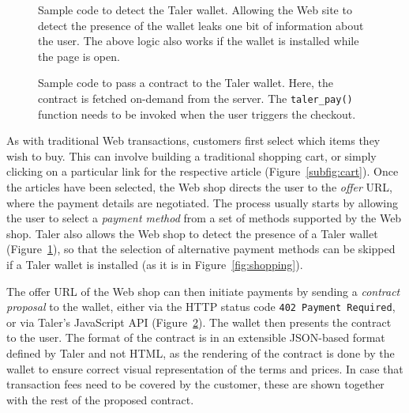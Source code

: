 \documentclass{llncs}
\begin{document}
{}

\begin{figure}[h!]
 \lstset{language=HTML5}
 
 \caption{Sample code to detect the Taler wallet. Allowing the
  Web site to detect the presence of the wallet leaks one bit
  of information about the user. The above logic also works
  if the wallet is installed while the page is open.}
  \label{listing:presence}
\end{figure}


\begin{figure}[h!]
 \lstset{language=JavaScript}
 
 \caption{Sample code to pass a contract to the Taler wallet.
          Here, the contract is fetched on-demand from the server.
          The {\tt taler\_pay()} function needs to be invoked
          when the user triggers the checkout.}
 \label{listing:contract}
\end{figure}


As with traditional Web transactions, customers first select which
items they wish to buy.  This can involve building a traditional
shopping cart, or simply clicking on a particular link for the
respective article (Figure~\ref{subfig:cart}).  Once the articles have
been selected, the Web shop directs the user to the {\em offer} URL,
where the payment details are negotiated.  The process usually starts
by allowing the user to select a {\em payment method} from a set of
methods supported by the Web shop.  Taler also allows the Web shop to
detect the presence of a Taler wallet (Figure~\ref{listing:presence}),
so that the selection of alternative payment methods can be skipped if
a Taler wallet is installed (as it is in Figure~\ref{fig:shopping}).

The offer URL of the Web shop can then initiate payments by sending a
\emph{contract proposal} to the wallet, either via the HTTP status
code {\tt 402 Payment Required}, or via Taler's JavaScript API
(Figure~\ref{listing:contract}).  The wallet then presents the
contract to the user.  The format of the contract is in an extensible
JSON-based format defined by Taler and not HTML, as the rendering of
the contract is done by the wallet to ensure correct visual
representation of the terms and prices.  In case that transaction fees
need to be covered by the customer, these are shown together with the
rest of the proposed contract.
\end{document}
